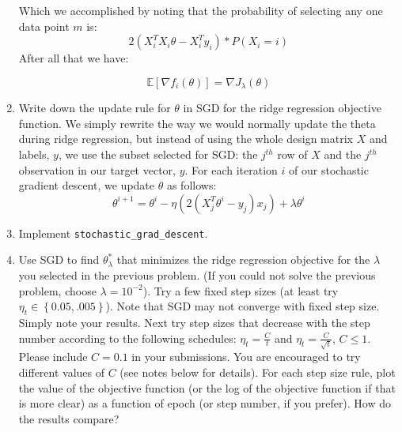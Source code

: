 \documentclass{article}
\begin{document}
\begin{enumerate}
Which we accomplished by noting that the probability of selecting any one data point $m$ is:
$$2(X_i^TX_i\theta - X_i^Ty_i) * P(X_i = i)$$
After all that we have:
    
    $$\mathbb{E}[\nabla f_{i}(\theta)] = \nabla J_\lambda(\theta)$$ 
 
   
\item Write down the update rule for $\theta$ in SGD for the ridge
regression objective function.
\subitem
We simply rewrite the way we would normally update the theta during ridge regression, but instead of using the whole design matrix $X$ and labels, $y$, we use the subset selected for SGD: the $j^{th}$ row of $X$ and the $j^{th}$ observation in our target vector, $y$. For each iteration $i$ of our stochastic gradient descent, we update $\theta$ as follows:
$$\theta^{i+1} = \theta^i - \eta(2(X^T_j\theta^i - y_j)x_j) + \lambda \theta^i$$
\item Implement \texttt{stochastic\_grad\_descent}. 

\item Use SGD to find $\theta_{\lambda}^{*}$ that minimizes the ridge regression
objective for the $\lambda$ you selected in the previous
problem. (If you could not solve the previous problem, choose $\lambda=10^{-2}$). Try a few fixed step sizes (at least try $\eta_{t}\in\left\{ 0.05,.005\right\} $).
Note that SGD may not converge with fixed step size. Simply note your
results. Next try step sizes that decrease with the step number according
to the following schedules: $\eta_{t}=\frac{C}{t}$ and $\eta_{t}=\frac{C}{\sqrt{t}}$, $C \leq 1$. Please include $C = 0.1$ in your submissions. You are encouraged to try different values of $C$ (see notes below for details).
For each step size rule, plot the value of the objective function
(or the log of the objective function if that is more clear) as a
function of epoch (or step number, if you prefer). How do the results compare?

\setcounter{saveenum}{\value{enumi}}
\end{enumerate}
\end{document}

